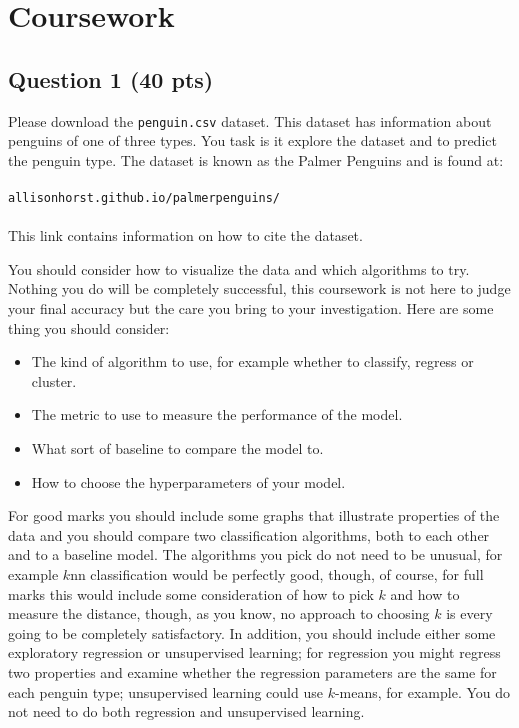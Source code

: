 \documentclass[12pt]{article}
\begin{document}
\section*{Coursework }

\subsection*{Question 1 (40 pts)}

Please download the \texttt{penguin.csv} dataset. This dataset has
information about penguins of one of three types. You task is it
explore the dataset and to predict the penguin type. The dataset is
known as the Palmer Penguins and is found at:\\
\\
\texttt{allisonhorst.github.io/palmerpenguins/}\\
\\
This link contains information on how to cite the dataset.

You should consider how to visualize the data and which algorithms to
try. Nothing you do will be completely successful, this coursework is
not here to judge your final accuracy but the care you bring to your
investigation. Here are some thing you should consider:
\begin{itemize}
  \item The kind of algorithm to use, for example whether to classify, regress  or cluster.
  \item The metric to use to measure the performance of the model.
  \item What sort of baseline to compare the model to.
  \item How to choose the hyperparameters of your model.
\end{itemize}
For good marks you should include some graphs that illustrate
properties of the data and you should compare two classification
algorithms, both to each other and to a baseline model. The algorithms
you pick do not need to be unusual, for example $k$nn classification
would be perfectly good, though, of course, for full marks this would
include some consideration of how to pick $k$ and how to measure the
distance, though, as you know, no approach to choosing $k$ is every
going to be completely satisfactory. In addition, you should include
either some exploratory regression or unsupervised learning; for
regression you might regress two properties and examine whether the
regression parameters are the same for each penguin type; unsupervised
learning could use $k$-means, for example. You do not need to do both
regression and unsupervised learning.
\end{document}
